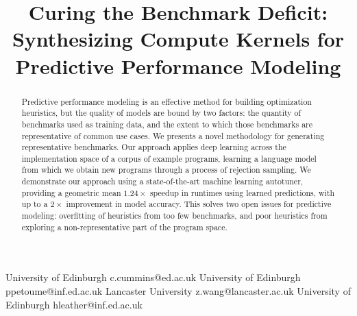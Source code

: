 \documentclass[preprint,nonatbib,10pt,nocopyrightspace]{sigplanconf}
\begin{document}
\setlength{\pdfpageheight}{\paperheight}
\setlength{\pdfpagewidth}{\paperwidth}





\preprintfooter{}   %


\title{Curing the Benchmark Deficit: %
  Synthesizing Compute Kernels for Predictive Performance Modeling}


           {University of Edinburgh}
           {c.cummins@ed.ac.uk}
           {University of Edinburgh}
           {ppetoume@inf.ed.ac.uk}
           {Lancaster University}
           {z.wang@lancaster.ac.uk}
           {University of Edinburgh}
           {hleather@inf.ed.ac.uk}

\maketitle

\begin{abstract}
  Predictive performance modeling is an effective method for building
  optimization heuristics, but the quality of models are bound by two
  factors: the quantity of benchmarks used as training data, and the
  extent to which those benchmarks are representative of common use
  cases. We presents a novel methodology for generating representative
  benchmarks. Our approach applies deep learning across the
  implementation space of a corpus of example programs, learning a
  language model from which we obtain new programs through a process
  of rejection sampling.%
  We demonstrate our approach using a state-of-the-art machine
  learning autotuner, providing a geometric mean $1.24\times$ speedup
  in runtimes using learned predictions, with up to a $2\times$
  improvement in model accuracy. This solves two open issues for
  predictive modeling: overfitting of heuristics from too few
  benchmarks, and poor heuristics from exploring a non-representative
  part of the program space.
\end{abstract}
\end{document}
